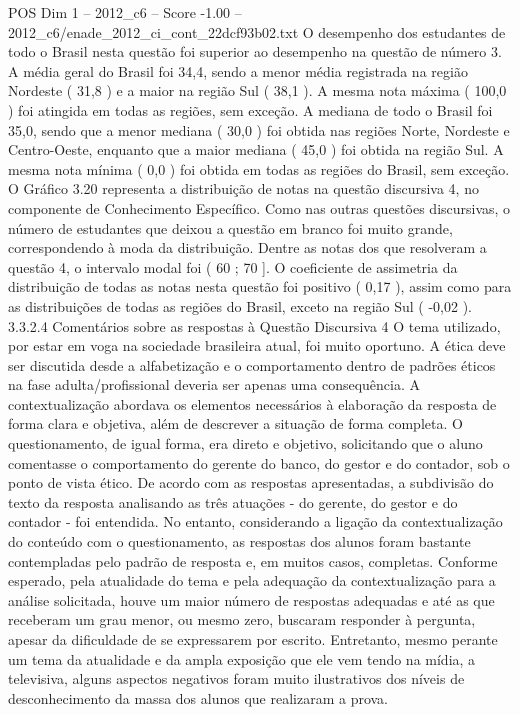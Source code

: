 \begin{textsample}{POS Dim 1 – 2012\_c6 – Score -1.00 – 2012\_c6/enade\_2012\_ci\_cont\_22dcf93b02.txt}
O desempenho dos estudantes de todo o Brasil nesta questão foi superior ao desempenho na questão de número 3.
A média geral do Brasil foi 34,4, sendo a menor média registrada na região Nordeste ( 31,8 ) e a maior na região Sul ( 38,1 ).
A mesma nota máxima ( 100,0 ) foi atingida em todas as regiões, sem exceção.
A mediana de todo o Brasil foi 35,0, sendo que a menor mediana ( 30,0 ) foi obtida nas regiões Norte, Nordeste e Centro-Oeste, enquanto que a maior mediana ( 45,0 ) foi obtida na região Sul.
A mesma nota mínima ( 0,0 ) foi obtida em todas as regiões do Brasil, sem exceção.
O Gráfico 3.20 representa a distribuição de notas na questão discursiva 4, no componente de Conhecimento Específico.
Como nas outras questões discursivas, o número de estudantes que deixou a questão em branco foi muito grande, correspondendo à moda da distribuição.
Dentre as notas dos que resolveram a questão 4, o intervalo modal foi ( 60 ; 70 ].
O coeficiente de assimetria da distribuição de todas as notas nesta questão foi positivo ( 0,17 ), assim como para as distribuições de todas as regiões do Brasil, exceto na região Sul ( -0,02 ). 3.3.2.4 Comentários sobre as respostas à Questão Discursiva 4 O tema utilizado, por estar em voga na sociedade brasileira atual, foi muito oportuno.
A ética deve ser discutida desde a alfabetização e o comportamento dentro de padrões éticos na fase adulta/profissional deveria ser apenas uma consequência.
A contextualização abordava os elementos necessários à elaboração da resposta de forma clara e objetiva, além de descrever a situação de forma completa.
O questionamento, de igual forma, era direto e objetivo, solicitando que o aluno comentasse o comportamento do gerente do banco, do gestor e do contador, sob o ponto de vista ético.
De acordo com as respostas apresentadas, a subdivisão do texto da resposta analisando as três atuações - do gerente, do gestor e do contador - foi entendida.
No entanto, considerando a ligação da contextualização do conteúdo com o questionamento, as respostas dos alunos foram bastante contempladas pelo padrão de resposta e, em muitos casos, completas.
Conforme esperado, pela atualidade do tema e pela adequação da contextualização para a análise solicitada, houve um maior número de respostas adequadas e até as que receberam um grau menor, ou mesmo zero, buscaram responder à pergunta, apesar da dificuldade de se expressarem por escrito.
Entretanto, mesmo perante um tema da atualidade e da ampla exposição que ele vem tendo na mídia, a televisiva, alguns aspectos negativos foram muito ilustrativos dos níveis de desconhecimento da massa dos alunos que realizaram a prova.

\end{textsample}
